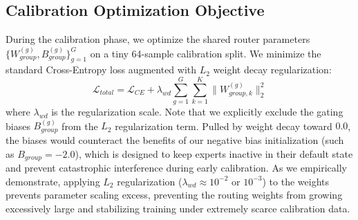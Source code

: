 \subsection{Calibration Optimization Objective}
During the calibration phase, we optimize the shared router parameters $\{W_{group}^{(g)}, B_{group}^{(g)}\}_{g=1}^G$ on a tiny 64-sample calibration split. We minimize the standard Cross-Entropy loss augmented with $L_2$ weight decay regularization:
\begin{equation}
    \mathcal{L}_{total} = \mathcal{L}_{CE} + \lambda_{wd} \sum_{g=1}^G \sum_{k=1}^K \|W_{group, k}^{(g)}\|_2^2
\end{equation}
where $\lambda_{wd}$ is the regularization scale. Note that we explicitly exclude the gating biases $B_{group}^{(g)}$ from the $L_2$ regularization term. Pulled by weight decay toward $0.0$, the biases would counteract the benefits of our negative bias initialization (such as $B_{group} = -2.0$), which is designed to keep experts inactive in their default state and prevent catastrophic interference during early calibration. As we empirically demonstrate, applying $L_2$ regularization ($\lambda_{wd} \approx 10^{-2}$ or $10^{-3}$) to the weights prevents parameter scaling excess, preventing the routing weights from growing excessively large and stabilizing training under extremely scarce calibration data.
